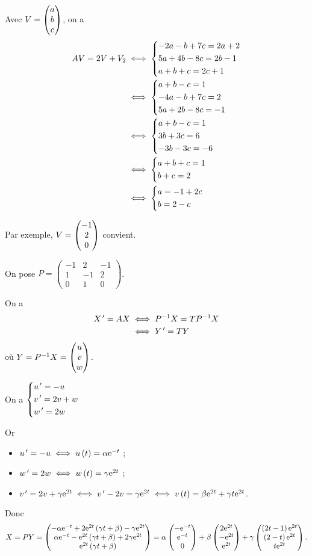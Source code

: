 \begin{corr}
Avec \(V=\begin{pmatrix}a\\b\\c\end{pmatrix}\), on a \[\begin{aligned}
AV=2V+V_2&\iff\begin{dcases}
-2a-b+7c=2a+2 \\
5a+4b-8c=2b-1 \\
a+b+c=2c+1
\end{dcases} \\
&\iff\begin{dcases}
a+b-c=1 \\
-4a-b+7c=2 \\
5a+2b-8c=-1
\end{dcases} \\
&\iff\begin{dcases}
a+b-c=1 \\
3b+3c=6 \\
-3b-3c=-6
\end{dcases} \\
&\iff\begin{dcases}
a+b+c=1 \\
b+c=2
\end{dcases} \\
&\iff\begin{dcases}
a=-1+2c \\
b=2-c
\end{dcases}
\end{aligned}\]

Par exemple, \(V=\begin{pmatrix}-1\\2\\0\end{pmatrix}\) convient.

On pose \(P=\begin{pmatrix}
-1 & 2 & -1 \\
1 & -1 & 2 \\
0 & 1 & 0
\end{pmatrix}\).

On a \[\begin{aligned}
X^{\,\prime}=AX&\iff P^{-1} X=TP^{-1} X \\
&\iff Y^{\,\prime}=TY
\end{aligned}\] où \(Y=P^{-1} X=\begin{pmatrix}u\\v\\w\end{pmatrix}\).

On a \(\begin{dcases}
u^{\,\prime}=-u \\
v^{\,\prime}=2v+w \\
w^{\,\prime}=2w
\end{dcases}\)

Or \begin{itemize}
    \item \(u^{\,\prime}=-u\iff u\left(t\right)=\alpha\mathrm{e}^{-t}\) ;
    \item \(w^{\,\prime}=2w\iff w\left(t\right)=\gamma\mathrm{e}^{2t}\) ;
    \item \(v^{\,\prime}=2v+\gamma\mathrm{e}^{2t}\iff v^{\,\prime}-2v=\gamma\mathrm{e}^{2t}\iff v\left(t\right)=\beta\mathrm{e}^{2t}+\gamma t\mathrm{e}^{2t}\). \\
\end{itemize}

Donc \[X=PY=\begin{pmatrix}-\alpha\mathrm{e}^{-t}+2\mathrm{e}^{2t}\left(\gamma t+\beta\right)-\gamma\mathrm{e}^{2t}\\\alpha\mathrm{e}^{-t}-\mathrm{e}^{2t}\left(\gamma t+\beta\right)+2\gamma\mathrm{e}^{2t}\\\mathrm{e}^{2t}\left(\gamma t+\beta\right)\end{pmatrix}=\alpha\begin{pmatrix}-\mathrm{e}^{-t}\\\mathrm{e}^{-t}\\0\end{pmatrix}+\beta\begin{pmatrix}2\mathrm{e}^{2t}\\-\mathrm{e}^{2t}\\\mathrm{e}^{2t}\end{pmatrix}+\gamma\begin{pmatrix}\left(2t-1\right)\mathrm{e}^{2t}\\\left(2-t\right)\mathrm{e}^{2t}\\t\mathrm{e}^{2t}\end{pmatrix}.\]
\end{corr}

